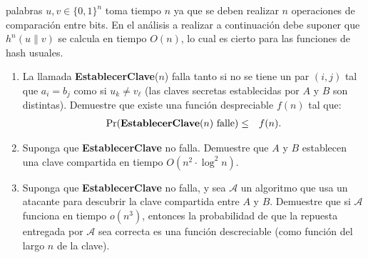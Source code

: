 palabras $u, v \in \{0,1\}^n$ toma tiempo $n$ ya que se deben realizar
$n$ operaciones de comparación entre bits. En el análisis a realizar a
continuación debe suponer que $h^n(u \| v)$ se calcula en tiempo
$O(n)$, lo cual es cierto para las funciones de hash usuales.
\begin{enumerate}
\item La llamada {\bf EstablecerClave}($n$) falla tanto si no se tiene un par $(i, j)$ tal que $a_i = b_j$ como si $u_k \neq v_\ell$ (las claves secretas establecidas por $A$ y $B$ son distintas). Demuestre que existe una función despreciable $f(n)$ tal que:
\begin{eqnarray*}
\Pr(\text{{\bf EstablecerClave}($n$) falle}) & \leq & f(n).
\end{eqnarray*}

\item Suponga que {\bf EstablecerClave} no falla. Demuestre que $A$ y $B$ establecen una clave compartida en tiempo $O(n^2 \cdot \log^2 n)$.

\item Suponga que {\bf EstablecerClave} no falla, y sea $\mathcal{A}$ un algoritmo que usa un atacante para descubrir la clave compartida entre $A$ y $B$. Demuestre que si $\mathcal{A}$ funciona en tiempo $o(n^3)$, entonces la probabilidad de que la repuesta entregada por $\mathcal{A}$ sea correcta es una función descreciable (como función del largo $n$ de la clave).
\end{enumerate}




